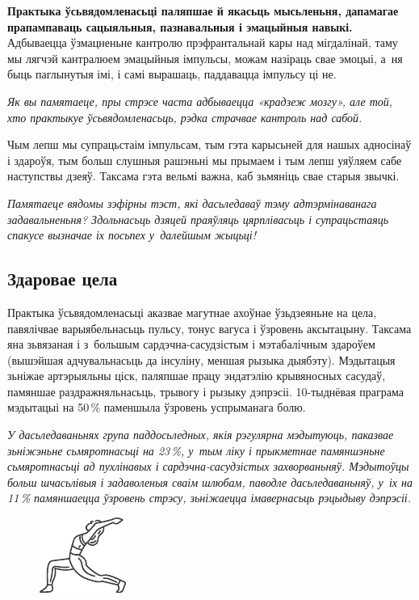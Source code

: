 \textbf{Практыка ўсьвядомленасьці паляпшае й якасьць мысьленьня, дапамагае прапампаваць сацыяльныя, пазнавальныя і эмацыйныя навыкі.} Адбываецца ўзмацненьне кантролю прэфрантальнай кары над мігдалінай, таму мы лягчэй кантралюем эмацыйныя імпульсы, можам назіраць свае эмоцыі, а~ня быць паглынутыя імі, і самі вырашаць, паддавацца імпульсу ці не.

\emph{Як вы памятаеце, пры стрэсе часта адбываецца «крадзеж мозгу», але той, хто практыкуе ўсьвядомленасьць, рэдка страчвае кантроль над сабой.}

Чым лепш мы супрацьстаім імпульсам, тым гэта карысьней для нашых адносінаў і здароўя, тым больш слушныя рашэньні мы прымаем і тым лепш уяўляем сабе наступствы дзеяў. Таксама гэта вельмі важна, каб зьмяніць свае старыя звычкі. 

\emph{Памятаеце вядомы зэфірны тэст, які дасьледаваў тэму адтэрмінаванага задавальненьня? Здольнасьць дзяцей праяўляць цярплівасьць і супрацьстаяць спакусе вызначае іх посьпех у~далейшым жыцьці!}

\subsection*{Здаровае цела}

Практыка ўсьвядомленасьці аказвае магутнае ахоўнае ўзьдзеяньне на цела, павялічвае варыябельнасьць пульсу, тонус вагуса і ўзровень аксытацыну. Таксама яна зьвязаная і з~большым сардэчна-сасудзістым і мэтабалічным здароўем (вышэйшая адчувальнасьць да інсуліну, меншая рызыка дыябэту). Мэдытацыя зьніжае артэрыяльны ціск, паляпшае працу эндатэлію крывяносных сасудаў, памяншае раздражняльнасьць, трывогу і рызыку дэпрэсіі. 10-тыднёвая праграма мэдытацыі на 50\,\% паменшыла ўзровень успрыманага болю.

\emph{У дасьледаваньнях група паддосьледных, якія рэгулярна мэдытуюць, паказвае зьніжэньне сьмяротнасьці на 23\,\%, у~тым ліку і прыкметнае памяншэньне сьмяротнасьці ад пухлінавых і сардэчна-сасудзістых захворваньняў. Мэдытоўцы больш шчасьлівыя і задаволеныя сваім шлюбам, паводле дасьледаваньняў, у~іх на 11\,\% памяншаецца ўзровень стрэсу, зьніжаецца імавернасьць рэцыдыву дэпрэсіі.}

\begin{figure}[htb!]
  \centering
  \includegraphics[scale=1.5]{willpower/ch8/4.pdf}
\end{figure}

